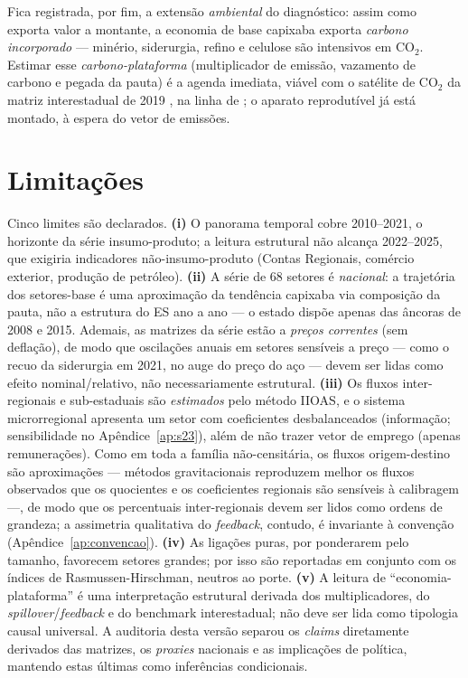 \documentclass[11pt,a4paper]{article}
\begin{document}
Fica registrada, por fim, a extensão \emph{ambiental} do diagnóstico: assim como exporta valor a
montante, a economia de base capixaba exporta \emph{carbono incorporado} --- minério, siderurgia,
refino e celulose são intensivos em CO$_2$. Estimar esse \emph{carbono-plataforma} (multiplicador de
emissão, vazamento de carbono e pegada da pauta) é a agenda imediata, viável com o satélite de CO$_2$
da matriz interestadual de 2019 \citep{haddad2025matriz}, na linha de \citet{carvalho2009avaliacao};
o aparato reprodutível já está montado, à espera do vetor de emissões.

\section{Limitações}
\label{sec:limites}
Cinco limites são declarados. \textbf{(i)} O panorama temporal cobre 2010--2021, o
horizonte da série insumo-produto; a leitura estrutural não alcança 2022--2025, que
exigiria indicadores não-insumo-produto (Contas Regionais, comércio exterior, produção
de petróleo). \textbf{(ii)} A série de 68 setores é \emph{nacional}: a trajetória dos
setores-base é uma aproximação da tendência capixaba via composição da pauta, não a
estrutura do ES ano a ano --- o estado dispõe apenas das âncoras de 2008 e 2015. Ademais,
as matrizes da série estão a \emph{preços correntes} (sem deflação), de modo que oscilações
anuais em setores sensíveis a preço --- como o recuo da siderurgia em 2021, no auge do preço
do aço --- devem ser lidas como efeito nominal/relativo, não necessariamente estrutural.
\textbf{(iii)} Os fluxos inter-regionais e sub-estaduais são \emph{estimados} pelo
método IIOAS, e o sistema microrregional apresenta um setor com coeficientes
desbalanceados (informação; sensibilidade no Apêndice~\ref{ap:s23}), além de não trazer
vetor de emprego (apenas remunerações). Como em toda a família não-censitária, os fluxos
origem-destino são aproximações --- métodos gravitacionais reproduzem melhor os fluxos
observados que os quocientes \citep{riddington2006comparison} e os coeficientes regionais
são sensíveis à calibragem \citep{flegg2016evaluating} ---, de modo que os percentuais
inter-regionais devem ser lidos como ordens de grandeza; a assimetria qualitativa do
\emph{feedback}, contudo, é invariante à convenção (Apêndice~\ref{ap:convencao}).
\textbf{(iv)} As ligações puras, por ponderarem pelo tamanho, favorecem setores
grandes; por isso são reportadas em conjunto com os índices de Rasmussen-Hirschman,
neutros ao porte. \textbf{(v)} A leitura de ``economia-plataforma'' é uma interpretação
estrutural derivada dos multiplicadores, do \emph{spillover}/\emph{feedback} e do benchmark
interestadual; não deve ser lida como tipologia causal universal. A auditoria desta versão separou os
\emph{claims} diretamente derivados das matrizes, os \emph{proxies} nacionais e as implicações de
política, mantendo estas últimas como inferências condicionais.
\end{document}
